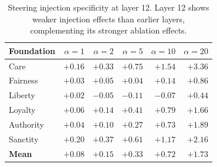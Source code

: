 \begin{table}[h]
\centering
\small
\begin{tabular}{l rrrrr}
\toprule
Foundation & $\alpha{=}1$ & $\alpha{=}2$ & $\alpha{=}5$ & $\alpha{=}10$ & $\alpha{=}20$ \\
\midrule
Care      & $+0.16$ & $+0.33$ & $+0.75$ & $+1.54$ & $+3.36$ \\
Fairness  & $+0.03$ & $+0.05$ & $+0.04$ & $+0.14$ & $+0.86$ \\
Liberty   & $+0.02$ & $-0.05$ & $-0.11$ & $-0.07$ & $+0.44$ \\
Loyalty   & $+0.06$ & $+0.14$ & $+0.41$ & $+0.79$ & $+1.66$ \\
Authority & $+0.04$ & $+0.10$ & $+0.27$ & $+0.73$ & $+1.89$ \\
Sanctity  & $+0.20$ & $+0.37$ & $+0.61$ & $+1.17$ & $+2.16$ \\
\midrule
\textbf{Mean} & $+0.08$ & $+0.15$ & $+0.33$ & $+0.72$ & $+1.73$ \\
\bottomrule
\end{tabular}
\caption{Steering injection specificity at layer 12. Layer 12 shows weaker injection effects than earlier layers, complementing its stronger ablation effects.}
\label{tab:dose-layer12}
\end{table}
